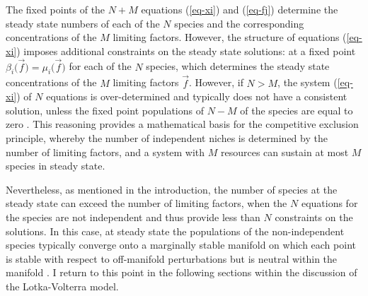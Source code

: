 The fixed points of the $N+M$ equations (\ref{eq-xi}) and (\ref{eq-fj}) determine the steady state numbers of each of the $N$ species and the corresponding concentrations of the $M$ limiting factors. However, the structure of equations (\ref{eq-xi}) imposes additional constraints on the steady state solutions: at a fixed point $\beta_i\big(\vec{f}\big) = \mu_i\big(\vec{f}\big)$ for each of the $N$ species, which determines the steady state concentrations of the $M$ limiting factors $\vec{f}$. %
However, if $N>M$, the system (\ref{eq-xi}) of $N$ equations is over-determined and typically does not have a consistent solution, unless the fixed point populations of $N-M$ of the species are equal to zero \cite{Armstrong1976,McGehee1977a,Armstrong1980,Fisher2015,Posfai2017}. 
This reasoning provides a mathematical basis for the competitive exclusion principle, whereby the number of independent niches is determined by the number of limiting factors, and a system with $M$ resources can sustain at most $M$ species in steady state. %

Nevertheless, as mentioned in the introduction, the number of species at the steady state can exceed the number of limiting factors, when the $N$ equations for the species are not independent and thus provide less than $N$ constraints on the solutions. 
In this case, at steady state the populations of the non-independent species typically converge onto a marginally stable manifold on which each point is stable with respect to off-manifold perturbations but is neutral within the manifold \cite{McGehee1977a,Case1979,Lin2012,Antal2006,Dobrinevski2012}. 
I return to this point in the following sections within the discussion of the Lotka-Volterra model. %


